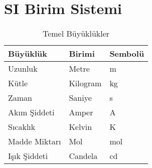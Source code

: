 \chapter{SI Birim Sistemi}
\pagestyle{fancy}
\fancyhf{}
\lhead{\thepage}
\begin{table}[h!]
    \centering
    \caption{Temel Büyüklükler}
    \vspace*{0.5cm}
    \begin{tabular}{| m{3cm} | m{3cm} | m{2cm} |}
        \hline
        Büyüklük & Birimi & Sembolü \\ \hline \hline
        Uzunluk & Metre & m \\ \hline
        Kütle & Kilogram & kg \\ \hline
        Zaman & Saniye & s \\ \hline
        Akım Şiddeti & Amper & A \\ \hline
        Sıcaklık & Kelvin & K \\ \hline
        Madde Miktarı & Mol & mol \\ \hline
        Işık Şiddeti & Candela & cd \\ \hline
    \end{tabular}
    \label{tab:sitemel}
\end{table}

